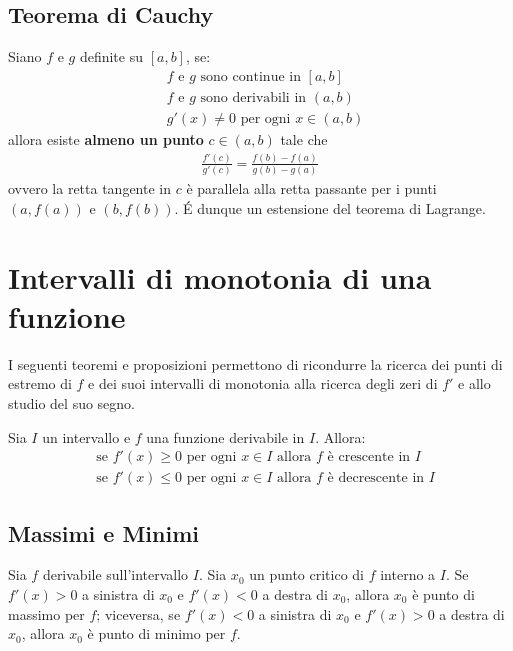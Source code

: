 \documentclass{book}
\begin{document}
\begin{theorem}
    \subsection{Teorema di Cauchy}
    Siano \(f\) e \(g\) definite su \([a,b]\), se:
    \begin{align*}
         & f \text{ e } g \text{ sono continue in } [a,b]   \\
         & f \text{ e } g \text{ sono derivabili in } (a,b) \\
         & g'(x) \neq 0 \text{ per ogni } x \in (a,b)
    \end{align*}
    allora esiste \textbf{almeno un punto} \(c \in (a,b)\) tale che
    \begin{align*}
        \frac{f'(c)}{g'(c)}=\frac{f(b)-f(a)}{g(b)-g(a)}
    \end{align*}
    ovvero la retta tangente in \(c\) è parallela alla retta passante per i punti \((a,f(a))\) e \((b,f(b))\).
    \'E dunque un estensione del teorema di Lagrange.
\end{theorem}

\section{Intervalli di monotonia di una funzione}
I seguenti teoremi e proposizioni permettono di ricondurre la ricerca dei
punti di estremo di \( f \) e dei suoi intervalli di monotonia alla ricerca degli zeri di
\( f' \) e allo studio del suo segno.

\begin{proposition}
    Sia \(I\) un intervallo e \(f\) una funzione derivabile in \(I\). Allora:
    \begin{align*}
         & \text{se } f'(x) \geq 0 \text{ per ogni } x \in I \text{ allora } f \text{ è crescente in } I   \\
         & \text{se } f'(x) \leq 0 \text{ per ogni } x \in I \text{ allora } f \text{ è decrescente in } I
    \end{align*}
\end{proposition}

\begin{theorem}
    \subsection{Massimi e Minimi}
    Sia \( f \) derivabile sull'intervallo \( I \). Sia \( x_0 \) un punto critico
    di \( f \) interno a \( I \). Se \( f'(x) > 0 \) a sinistra di \( x_0 \) e \( f'(x) < 0 \) a destra di \( x_0 \), allora
    \( x_0 \) è punto di massimo per \( f \); viceversa, se \( f'(x) < 0 \) a sinistra di \( x_0 \) e
    \( f'(x) > 0 \) a destra di \( x_0 \), allora \( x_0 \) è punto di minimo per \( f \).
\end{theorem}
\end{document}
